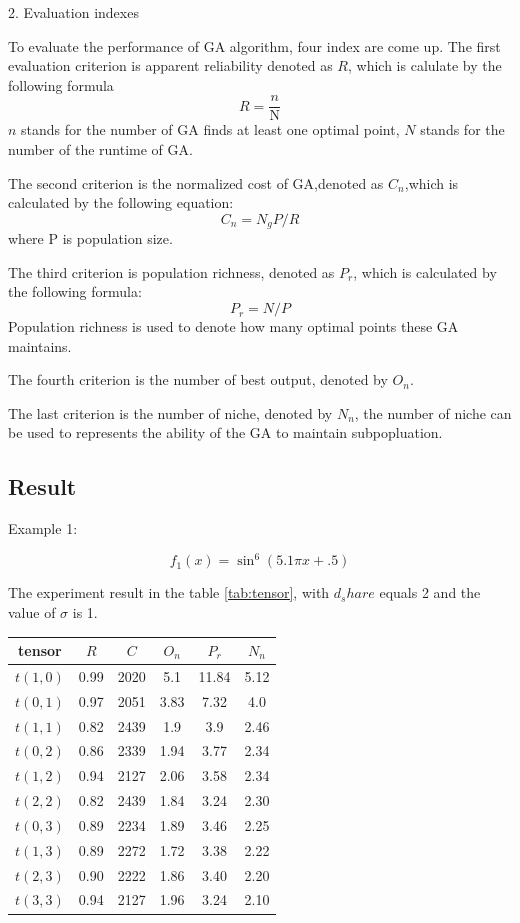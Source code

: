 \documentclass[smallextended]{svjour3}       %
\begin{document}
\begin{multicols}{2}
2. Evaluation indexes

To evaluate the performance of GA algorithm, four index are come up. The first evaluation criterion
is apparent reliability denoted as $R$, which is calulate by the following formula
\begin{equation}
R = \frac{n}{\text{N}}
\end{equation}
$n$ stands for the number of GA finds at least one optimal point, $N$ stands for the number of the 
runtime of GA.

The second criterion is the normalized cost of GA,denoted as $C_n$,which is calculated by the following
equation:
\begin{equation}
C_{n} = N_{g}P/R
\end{equation}
where P is population size. 

The third criterion is population richness, denoted as $P_{r}$, which is calculated by the following
formula:
$$
P_{r} = N/P
$$
Population richness is used to denote how many optimal points these GA maintains.

The fourth criterion is the number of best output, denoted by $O_{n}$.

The last criterion is the number of niche, denoted by $N_{n}$, the number of niche can be used to 
represents the ability of the GA to maintain subpopluation.


\subsection{Result}
Example 1:

\begin{equation}
f_{1}(x)=\sin^{6}(5.1 \pi x+.5)
\end{equation}

The experiment result in the table \ref{tab:tensor}, with $d_share$ equals 2 and the value of $\sigma$ 
is 1.

\begin{center}
\begin{tabular}{cccccc}
	\toprule
    tensor & $R$ & $C$ & $O_{n}$ & $P_{r}$ & $N_{n}$\\
	\midrule
    $t(1,0)$ & 0.99 & 2020 & 5.1 & 11.84 & 5.12 \\
    $t(0,1)$ & 0.97 & 2051 & 3.83 & 7.32 & 4.0 \\
    $t(1,1)$ & 0.82 & 2439 & 1.9 & 3.9 & 2.46 \\
    $t(0,2)$ & 0.86 & 2339 & 1.94 & 3.77 & 2.34 \\
    $t(1,2)$ & 0.94 & 2127 & 2.06 & 3.58 & 2.34 \\
    $t(2,2)$ & 0.82 & 2439 & 1.84 & 3.24 & 2.30 \\
    $t(0,3)$ & 0.89 & 2234 & 1.89 & 3.46 & 2.25 \\
    $t(1,3)$ & 0.89 & 2272 & 1.72 & 3.38 & 2.22 \\
    $t(2,3)$ & 0.90 & 2222 & 1.86 & 3.40 & 2.20 \\
    $t(3,3)$ & 0.94 & 2127 & 1.96 & 3.24 & 2.10 \\
	\bottomrule
\end{tabular}
\label{tab:tensor}
\end{center}


\end{multicols}
\end{document}
